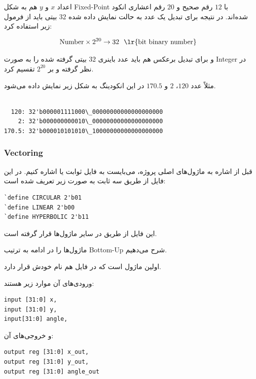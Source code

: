 \documentclass[12pt,titlepage,a4page , tikz , multi,table , svgnames,xcdraw]{article}
\begin{document}
اعداد $x$ و $y$ هم به شکل Fixed-Point با $12$ رقم صحیح و $20$ رقم اعشاری انکود شده‌اند. در نتیجه برای تبدیل یک عدد به حالت نمایش داده شده $32$ بیتی باید از فرمول زیر استفاده کرد:

$$\text{Number} \times 2^{20} \rightarrow 32 ~~\text{\lr{bit binary number}}$$

و برای تبدیل برعکس هم باید عدد باینری $32$ بیتی گرفته شده را به صورت Integer در نظر گرفته و بر $2^{20}$ تقسیم کرد.

مثلاً عدد $120$، $2$ و $170.5$ در این انکودینگ به شکل زیر نمایش داده می‌شود.
 
 
 \begin{latin}
\begin{verbatim}

  120: 32'b000001111000\_00000000000000000000
    2: 32'b000000000010\_00000000000000000000
170.5: 32'b000010101010\_10000000000000000000
\end{verbatim}
\end{latin} 

 
\subsubsection{Vectoring}

قبل از اشاره به ماژول‌های اصلی پروژه، می‌بایست به فایل ثوابت یا  اشاره کنیم. در این فایل از طریق  سه ثابت به صورت زیر تعریف شده است:
\begin{latin}
\begin{verbatim}
`define CIRCULAR 2'b01
`define LINEAR 2'b00
`define HYPERBOLIC 2'b11
\end{verbatim}
\end{latin}

این فایل از طریق  در سایر ماژول‌ها قرار گرفته است.

ماژول‌ها را در ادامه به ترتیب Bottom-Up شرح می‌دهیم.

اولین ماژول  است که در فایل هم نام خودش قرار دارد. 

 ورودی‌های آن موارد زیر هستند:

\begin{latin}
\begin{verbatim}
input [31:0] x,
input [31:0] y,
input[31:0] angle,
\end{verbatim}
\end{latin}

و خروجی‌های آن:

\begin{latin}
\begin{verbatim}
output reg [31:0] x_out,
output reg [31:0] y_out,
output reg [31:0] angle_out
\end{verbatim}
\end{latin}
\end{document}
